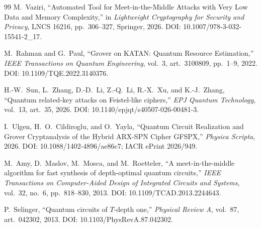 \documentclass[10pt,a4paper]{article}
\begin{document}
\begin{thebibliography}{99}
M.~Vaziri,
``Automated Tool for Meet-in-the-Middle Attacks with Very Low Data and Memory Complexity,''
in \emph{Lightweight Cryptography for Security and Privacy}, LNCS 16216, pp.~306--327, Springer, 2026.
DOI: 10.1007/978-3-032-15541-2\_17.

M.~Rahman and G.~Paul,
``Grover on KATAN: Quantum Resource Estimation,''
\emph{IEEE Transactions on Quantum Engineering}, vol.~3, art.~3100809, pp.~1--9, 2022.
DOI: 10.1109/TQE.2022.3140376.

H.-W.~Sun, L.~Zhang, D.-D.~Li, Z.-Q.~Li, R.-X.~Xu, and K.-J.~Zhang,
``Quantum related-key attacks on Feistel-like ciphers,''
\emph{EPJ Quantum Technology}, vol.~13, art.~35, 2026.
DOI: 10.1140/epjqt/s40507-026-00481-3.

I.~Ulgen, H.~O.~Cildiroglu, and O.~Yayla,
``Quantum Circuit Realization and Grover Cryptanalysis of the Hybrid ARX-SPN Cipher GFSPX,''
\emph{Physica Scripta}, 2026.
DOI: 10.1088/1402-4896/ae86c7; IACR ePrint 2026/949.

M.~Amy, D.~Maslov, M.~Mosca, and M.~Roetteler,
``A meet-in-the-middle algorithm for fast synthesis of depth-optimal quantum circuits,''
\emph{IEEE Transactions on Computer-Aided Design of Integrated Circuits and Systems},
vol.~32, no.~6, pp.~818--830, 2013.
DOI: 10.1109/TCAD.2013.2244643.

P.~Selinger,
``Quantum circuits of $T$-depth one,''
\emph{Physical Review A}, vol.~87, art.~042302, 2013.
DOI: 10.1103/PhysRevA.87.042302.

\end{thebibliography}
\end{document}
